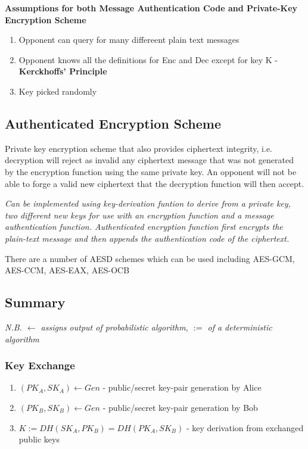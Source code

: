 \documentclass{article}
\begin{document}
\bigskip
\noindent
\textbf{Assumptions for both Message Authentication Code and Private-Key Encryption Scheme}
\begin{enumerate}
	\item Opponent can query for many differeent plain text messages
	\item Opponent knows all the definitions for Enc and Dec except for key K - \textbf{Kerckhoffs' Principle}
	\item Key picked randomly
\end{enumerate}

\subsection{Authenticated Encryption Scheme}
Private key encryption scheme that also provides ciphertext integrity, i.e. decryption will reject as invalid any ciphertext message that was not generated by the encryption function using the same private key. An opponent will not be able to forge a valid new ciphertext that the decryption function will then accept. 

\bigskip
\textit{Can be implemented using key-derivation funtion to derive from a private key, two different new keys for use with an encryption function and a message authentication function. Authenticated encryption function first encrypts the plain-text message and then appends the authentication code of the ciphertext.}

\bigskip
There are a number of AESD schemes which can be used including AES-GCM, AES-CCM, AES-EAX, AES-OCB

\subsection{Summary}
\textit{N.B. $\leftarrow$ assigns output of probabilistic algorithm, $:=$ of a deterministic algorithm}
\subsubsection{Key Exchange}
\begin{enumerate}
	\item $(PK_{A}, SK_{A}) \leftarrow Gen$ - public/secret key-pair generation by Alice
	\item $(PK_{B}, SK_{B}) \leftarrow Gen$ - public/secret key-pair generation by Bob 
	\item $K := DH(SK_{A}, PK_{B}) = DH(PK_{A}, SK_{B})$ - key derivation from exchanged public keys
\end{enumerate}
\end{document}
